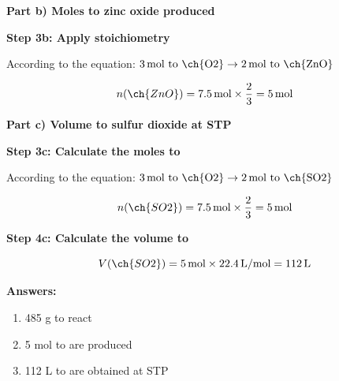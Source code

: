 \begin{exercise}
\begin{solu}
        \textbf{Part b) Moles to zinc oxide produced}

        \textbf{Step 3b: Apply stoichiometry}

        According to the equation: $3\,\text{mol to \ch{O2}} \rightarrow 2\,\text{mol to \ch{ZnO}}$

        \begin{equation*}
            n(\ch{ZnO}) = 7.5\,\text{mol} \times \frac{2}{3} = 5\,\text{mol}
        \end{equation*}

        \textbf{Part c) Volume to sulfur dioxide at STP}

        \textbf{Step 3c: Calculate the moles to }

        According to the equation: $3\,\text{mol to \ch{O2}} \rightarrow 2\,\text{mol to \ch{SO2}}$

        \begin{equation*}
            n(\ch{SO2}) = 7.5\,\text{mol} \times \frac{2}{3} = 5\,\text{mol}
        \end{equation*}

        \textbf{Step 4c: Calculate the volume to }

        \begin{equation*}
            V(\ch{SO2}) = 5\,\text{mol} \times 22.4\,\text{L/mol} = 112\,\text{L}
        \end{equation*}

        \textbf{Answers:}
        \begin{enumerate}[label=\letraminuscula]
            \item 485 g to  react
            \item 5 mol to  are produced
            \item 112 L to  are obtained at STP
        \end{enumerate}
    \end{solu}
\end{exercise}

